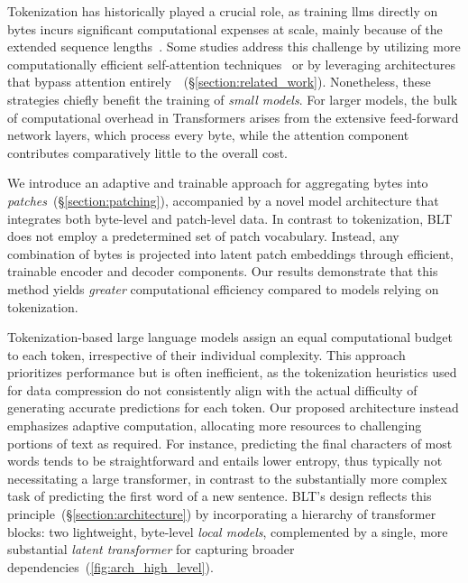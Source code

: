 Tokenization has historically played a crucial role, as training llms directly on bytes incurs significant computational expenses at scale, mainly because of the extended sequence lengths~\citep{xue2022byt5}. Some studies address this challenge by utilizing more computationally efficient self-attention techniques~\citep{el2020characterbert, clark2022canine} or by leveraging architectures that bypass attention entirely~\citep{wang2024mambabyte}~(\S\ref{section:related_work}). Nonetheless, these strategies chiefly benefit the training of \textit{small models}. For larger models, the bulk of computational overhead in Transformers arises from the extensive feed-forward network layers, which process every byte, while the attention component contributes comparatively little to the overall cost.

We introduce an adaptive and trainable approach for aggregating bytes into \textit{patches}~(\S\ref{section:patching}), accompanied by a novel model architecture that integrates both byte-level and patch-level data. In contrast to tokenization, {\textsc BLT} does not employ a predetermined set of patch vocabulary. Instead, any combination of bytes is projected into latent patch embeddings through efficient, trainable encoder and decoder components. Our results demonstrate that this method yields \textit{greater} computational efficiency compared to models relying on tokenization.

Tokenization-based large language models assign an equal computational budget to each token, irrespective of their individual complexity. This approach prioritizes performance but is often inefficient, as the tokenization heuristics used for data compression do not consistently align with the actual difficulty of generating accurate predictions for each token. Our proposed architecture instead emphasizes adaptive computation, allocating more resources to challenging portions of text as required. For instance, predicting the final characters of most words tends to be straightforward and entails lower entropy, thus typically not necessitating a large transformer, in contrast to the substantially more complex task of predicting the first word of a new sentence. {\textsc BLT}'s design reflects this principle~(\S\ref{section:architecture}) by incorporating a hierarchy of transformer blocks: two lightweight, byte-level \textit{local models}, complemented by a single, more substantial \textit{latent transformer} for capturing broader dependencies~(\autoref{fig:arch_high_level}). 

